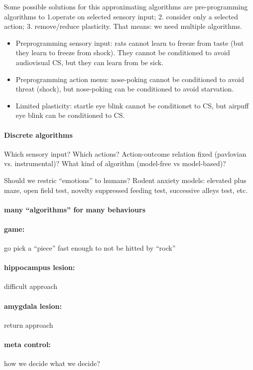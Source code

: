 \documentclass[12pt,article,oneside,a4paper]{memoir}
\begin{document}
Some possible solutions for this approximating algorithms are pre-programming algorithms to 1.operate on selected sensory input; 2. consider only a selected action; 3. remove/reduce plasticity. That means: we need multiple algorithms.

\begin{itemize}
\item Preprogramming sensory input: rats cannot learn to freeze from taste (but they learn to freeze from shock). They cannot be conditioned to avoid audiovisual CS, but they can learn from be sick.
\item Preprogramming action menu: nose-poking cannot be conditioned to avoid threat (shock), but nose-poking can be conditioned to avoid starvation.
\item Limited plasticity: startle eye blink cannot be conditionet to CS, but airpuff eye blink can be conditioned to CS.
\end{itemize}

\paragraph{Discrete algorithms} Which sensory input? Which actions? Action-outcome relation fixed (pavlovian vs. instrumental)? What kind of algorithm (model-free vs model-based)?

Should we restric ``emotions'' to humans? Rodent anxiety models: elevated plus maze, open field test, novelty suppressed feeding test, successive alleys test, etc.

\paragraph{many ``algorithms'' for many behaviours}
\paragraph{game:} go pick a ``piece'' fast enough to not be hitted by ``rock''
\paragraph{hippocampus lesion:} difficult approach
\paragraph{amygdala lesion:} return approach


\paragraph{meta control:} how we decide what we decide?
\end{document}
